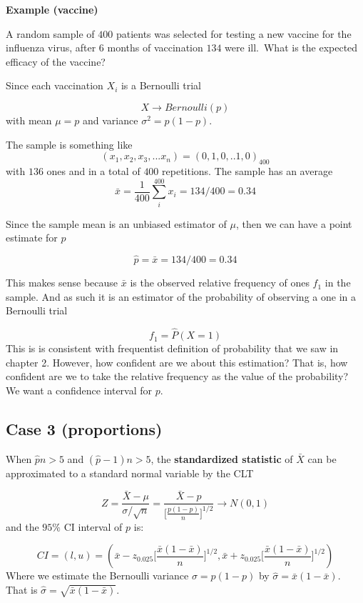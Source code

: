 \documentclass[
]{book}
\begin{document}
\textbf{Example (vaccine)}

A random sample of \(400\) patients was selected for testing a new vaccine for the influenza virus, after \(6\) months of vaccination \(134\) were ill.~What is the expected efficacy of the vaccine?

Since each vaccination \(X_i\) is a Bernoulli trial

\[X \rightarrow Bernoulli(p)\]
with mean \(\mu=p\) and variance \(\sigma^2=p(1-p)\).

The sample is something like
\[(x_1,x_2, x_3, ...x_n)=(0,1,0,.. 1, 0)_{400}\] with \(136\) ones and in a total of \(400\) repetitions. The sample has an average \[\bar{x}=\frac{1}{400}\sum_i^{400} x_i=134/400=0.34\]

Since the sample mean is an unbiased estimator of \(\mu\), then we can have a point estimate for \(p\)

\[\hat{p}=\bar{x}=134/400=0.34\]

This makes sense because \(\bar{x}\) is the observed relative frequency of ones \(f_1\) in the sample. And as such it is an estimator of the probability of observing a one in a Bernoulli trial

\[f_1 =\hat{P}(X=1)\]
This is is consistent with frequentist definition of probability that we saw in chapter 2. However, how confident are we about this estimation? That is, how confident are we to take the relative frequency as the value of the probability? We want a confidence interval for \(p\).

\hypertarget{case-3-proportions}{%
\subsection{Case 3 (proportions)}\label{case-3-proportions}}

When \(\hat{p}n>5\) and \((\hat{p}-1)n>5\), the \textbf{standardized statistic} of \(\bar{X}\) can be approximated to a standard normal variable by the CLT

\[Z=\frac{\bar{X}-\mu}{\sigma/\sqrt{n}}= \frac{\bar{X}-p}{\big[\frac{p(1-p)}{n} \big]^{1/2}}\rightarrow N(0,1)\]
and the \(95\%\) CI interval of \(p\) is:

\[CI=(l,u)=(\bar{x}-z_{0.025}\big[\frac{\bar{x}(1-\bar{x})}{n} \big]^{1/2},  \bar{x}+z_{0.025}\big[\frac{\bar{x}(1-\bar{x})}{n} \big]^{1/2})\]
Where we estimate the Bernoulli variance \(\sigma=p(1-p)\) by \(\hat{\sigma}=\bar{x}(1-\bar{x})\). That is \(\hat{\sigma}=\sqrt{\bar{x}(1-\bar{x})}\).
\end{document}

